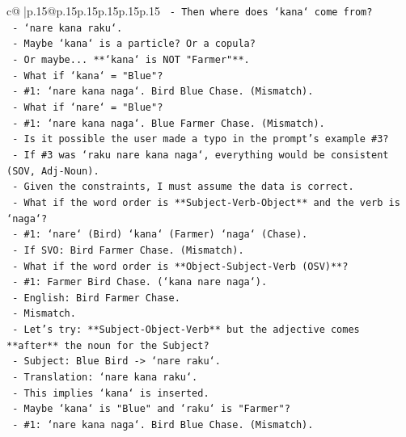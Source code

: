 \documentclass{article}
\begin{document}
{\begin{supertabular}{c@{$\;$}|p{.15\linewidth}@{}p{.15\linewidth}p{.15\linewidth}p{.15\linewidth}p{.15\linewidth}p{.15\linewidth}}
{{{\texttt{        {-} Then where does `kana` come from?} \\
\texttt{        {-} `nare kana raku`.} \\
\texttt{        {-} Maybe `kana` is a particle? Or a copula?} \\
\texttt{        {-} Or maybe... **`kana` is NOT "Farmer"**.} \\
\texttt{        {-} What if `kana` = "Blue"?} \\
\texttt{          {-} \#1: `nare kana naga`. Bird Blue Chase. (Mismatch).} \\
\texttt{        {-} What if `nare` = "Blue"?} \\
\texttt{          {-} \#1: `nare kana naga`. Blue Farmer Chase. (Mismatch).} \\
\texttt{    {-} Is it possible the user made a typo in the prompt's example \#3?} \\
\texttt{      {-} If \#3 was `raku nare kana naga`, everything would be consistent (SOV, Adj{-}Noun).} \\
\texttt{      {-} Given the constraints, I must assume the data is correct.} \\
\texttt{      {-} What if the word order is **Subject{-}Verb{-}Object** and the verb is `naga`?} \\
\texttt{        {-} \#1: `nare` (Bird) `kana` (Farmer) `naga` (Chase).} \\
\texttt{          {-} If SVO: Bird Farmer Chase. (Mismatch).} \\
\texttt{      {-} What if the word order is **Object{-}Subject{-}Verb (OSV)**?} \\
\texttt{        {-} \#1: Farmer Bird Chase. (`kana nare naga`).} \\
\texttt{          {-} English: Bird Farmer Chase.} \\
\texttt{          {-} Mismatch.} \\
\texttt{    {-} Let's try: **Subject{-}Object{-}Verb** but the adjective comes **after** the noun for the Subject?} \\
\texttt{      {-} Subject: Blue Bird {-}> `nare raku`.} \\
\texttt{      {-} Translation: `nare kana raku`.} \\
\texttt{      {-} This implies `kana` is inserted.} \\
\texttt{      {-} Maybe `kana` is "Blue" and `raku` is "Farmer"?} \\
\texttt{        {-} \#1: `nare kana naga`. Bird Blue Chase. (Mismatch).} \\
}}}
\end{supertabular}}
\end{document}
